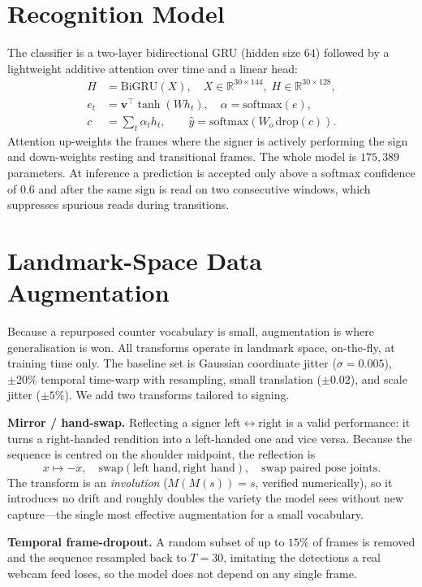 \documentclass[conference]{IEEEtran}
\begin{document}
\section{Recognition Model}
The classifier is a two-layer bidirectional GRU (hidden size $64$) followed by a
lightweight additive attention over time and a linear head:
\begin{align}
H &= \text{BiGRU}(X), \quad X \in \mathbb{R}^{30 \times 144},\; H \in \mathbb{R}^{30 \times 128},\\
e_t &= \mathbf{v}^{\!\top}\!\tanh(W h_t), \quad
\alpha = \text{softmax}(e),\\
c &= \textstyle\sum_t \alpha_t h_t, \qquad
\hat{y} = \text{softmax}(W_o\, \text{drop}(c)).
\end{align}
Attention up-weights the frames where the signer is actively performing the sign
and down-weights resting and transitional frames. The whole model is
$175{,}389$ parameters. At inference a prediction is accepted only above a
softmax confidence of $0.6$ and after the same sign is read on two consecutive
windows, which suppresses spurious reads during transitions.

\section{Landmark-Space Data Augmentation}
Because a repurposed counter vocabulary is small, augmentation is where
generalisation is won. All transforms operate in landmark space, on-the-fly, at
training time only. The baseline set is Gaussian coordinate jitter
($\sigma{=}0.005$), $\pm20\%$ temporal time-warp with resampling, small
translation ($\pm0.02$), and scale jitter ($\pm5\%$). We add two transforms
tailored to signing.

\textbf{Mirror / hand-swap.} Reflecting a signer left$\leftrightarrow$right is a
valid performance: it turns a right-handed rendition into a left-handed one and
vice versa. Because the sequence is centred on the shoulder midpoint, the
reflection is
\begin{equation}
x \mapsto -x,\quad \text{swap}(\text{left hand},\text{right hand}),\quad \text{swap paired pose joints}.
\end{equation}
The transform is an \emph{involution} ($M(M(s))=s$, verified numerically), so it
introduces no drift and roughly doubles the variety the model sees without new
capture---the single most effective augmentation for a small vocabulary.

\textbf{Temporal frame-dropout.} A random subset of up to $15\%$ of frames is
removed and the sequence resampled back to $T{=}30$, imitating the detections a
real webcam feed loses, so the model does not depend on any single frame.
\end{document}
